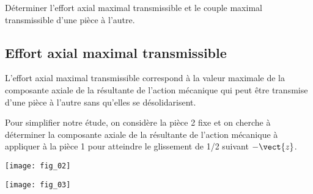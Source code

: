 \begin{obj}
Déterminer l’effort axial maximal transmissible et le couple maximal transmissible d’une pièce à 
l’autre.
\end{obj}

\subsection*{Effort axial maximal transmissible}


L’effort axial maximal transmissible correspond à la valeur maximale de la 
composante axiale de la résultante de l’action mécanique qui peut être transmise 
d’une pièce à l’autre sans qu’elles se désolidarisent. 
 
Pour simplifier notre étude, on considère la pièce 2 fixe et on cherche à déterminer 
la composante axiale de la résultante de l’action mécanique à appliquer à la pièce 1 
pour atteindre le glissement de 1/2 suivant $-\vect{z}$. 


\begin{marginfigure}
\texttt{[image: fig\_02]}
\end{marginfigure}



\begin{marginfigure}
\texttt{[image: fig\_03]}
\end{marginfigure}




